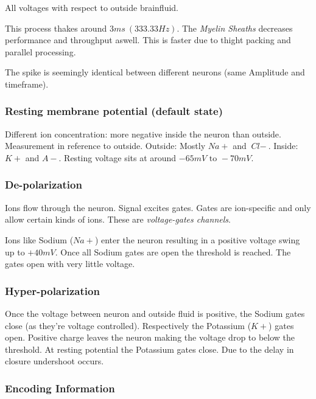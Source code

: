 \documentclass[
    fontsize      = 11pt,
    paper         = a4,
    twoside       = false,
    parskip       = half,
    pagesize      = false,
]{scrartcl}
\begin{document}
All voltages with respect to outside brainfluid.

This process thakes around \(3\si{ms}\ \left( 333.33\si{Hz} \right)\).
The \emph{Myelin Sheaths} decreases performance and throughput aswell.
This is faster due to thight packing and parallel processing.

The spike is seemingly identical between different neurons (same
Amplitude and timeframe).

\hypertarget{resting-membrane-potential-default-state}{%
\subsubsection{Resting membrane potential (default
state)}\label{resting-membrane-potential-default-state}}

Different ion concentration: more negative inside the neuron than
outside. Measurement in reference to outside. Outside: Mostly
\(\mathit{Na}+\) and \(\textit{Cl}-\). Inside: \(\mathit{K}+\) and
\(\mathit{A}-\). Resting voltage sits at around
\(-65\si{mV} \text{ to } -70\si{mV}\).

\hypertarget{de-polarization}{%
\subsubsection{De-polarization}\label{de-polarization}}

Ions flow through the neuron. Signal excites gates. Gates are
ion-specific and only allow certain kinds of ions. These are
\emph{voltage-gates channels}.

Ions like Sodium (\(\mathit{Na}+\)) enter the neuron resulting in a
positive voltage swing up to \(+40\si{mV}\). Once all Sodium gates are
open the threshold is reached. The gates open with very little voltage.

\hypertarget{hyper-polarization}{%
\subsubsection{Hyper-polarization}\label{hyper-polarization}}

Once the voltage between neuron and outside fluid is positive, the
Sodium gates close (as they're voltage controlled). Respectively the
Potassium (\(\mathit{K}+\)) gates open. Positive charge leaves the
neuron making the voltage drop to below the threshold. At resting
potential the Potassium gates close. Due to the delay in closure
undershoot occurs.

\hypertarget{encoding-information}{%
\subsubsection{Encoding Information}\label{encoding-information}}
\end{document}
